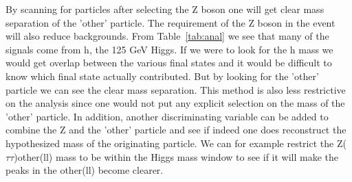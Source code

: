 



By scanning for particles after selecting the Z boson one will get clear mass separation of the 'other' particle. The requirement of the Z boson in the event will also reduce backgrounds.  From Table~\ref{tab:anal} we see that many of the signals come from h, the 125 GeV Higgs.  If we were to look for the h mass we would get overlap between the various final states and it would be difficult to know which final
state actually contributed.  But by looking for the 'other' particle we can see the clear mass separation.  This method is also less restrictive on the analysis since one would not put any explicit selection on the mass
of the 'other' particle. In addition, another discriminating variable can be added to combine the Z and the 'other' particle and see if indeed one does reconstruct the hypothesized mass of the originating particle.  We can for example restrict the Z($\tau\tau$)other(ll) mass to be within the Higgs mass window to see if it will make the peaks in the other(ll) become clearer.  

